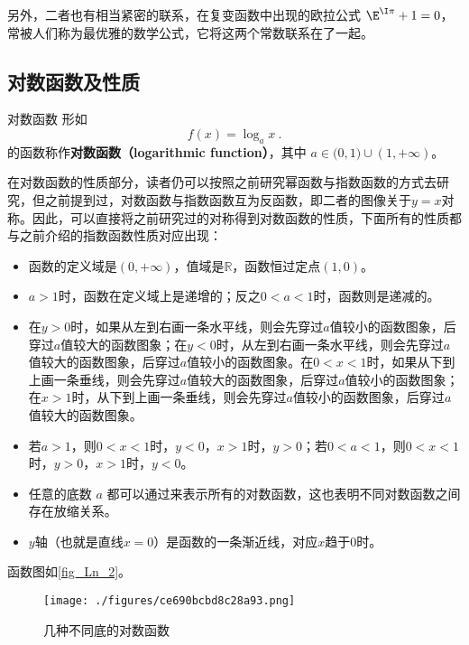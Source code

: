 另外，二者也有相当紧密的联系，在复变函数中出现的欧拉公式 $\E^{\I \pi} + 1 = 0$，常被人们称为最优雅的数学公式，它将这两个常数联系在了一起。

\subsection{对数函数及性质}

\begin{definition}{对数函数}
形如
\begin{equation}
f(x) = \log_a x~.
\end{equation}
的函数称作\textbf{对数函数（logarithmic function）}，其中 $a\in\mathbb (0,1)\cup(1,+\infty)$。
\end{definition}

在对数函数的性质部分，读者仍可以按照之前研究幂函数与指数函数的方式去研究，但之前提到过，对数函数与指数函数互为反函数，即二者的图像关于$y=x$对称。因此，可以直接将之前研究过的对称得到对数函数的性质，下面所有的性质都与之前介绍的指数函数性质对应出现：
\begin{itemize}
\item 函数的定义域是$(0,+\infty)$，值域是$\mathbb{R}$，函数恒过定点$(1,0)$。
\item $a>1$时，函数在定义域上是递增的；反之$0<a<1$时，函数则是递减的。
\item 在$y>0$时，如果从左到右画一条水平线，则会先穿过$a$值较小的函数图象，后穿过$a$值较大的函数图象；在$y<0$时，从左到右画一条水平线，则会先穿过$a$值较大的函数图象，后穿过$a$值较小的函数图象。在$0<x<1$时，如果从下到上画一条垂线，则会先穿过$a$值较大的函数图象，后穿过$a$值较小的函数图象；在$x>1$时，从下到上画一条垂线，则会先穿过$a$值较小的函数图象，后穿过$a$值较大的函数图象。
\item 若$a>1$，则$0<x<1$时，$y<0$，$x>1$时，$y>0$；若$0<a<1$，则$0<x<1$时，$y>0$，$x>1$时，$y<0$。
\item 任意的底数 $a$ 都可以通过来表示所有的对数函数，这也表明不同对数函数之间存在放缩关系。
\item $y$轴（也就是直线$x=0$）是函数的一条渐近线，对应$x$趋于$0$时。
\end{itemize}

函数图如\autoref{fig_Ln_2}。
\begin{figure}[ht]
\centering
\texttt{[image: ./figures/ce690bcbd8c28a93.png]}
\caption{几种不同底的对数函数} \label{fig_Ln_2}
\end{figure}

